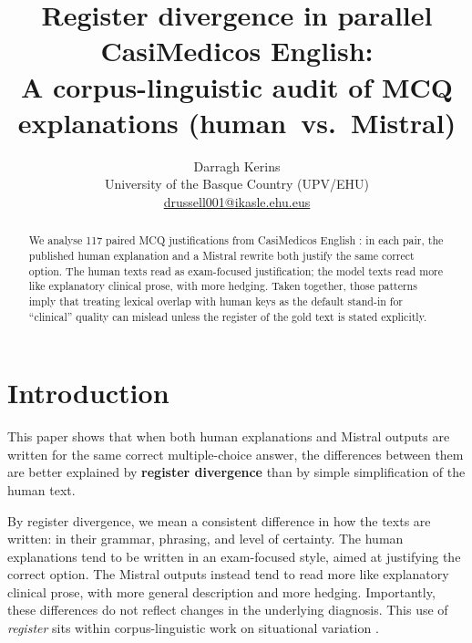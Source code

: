 \documentclass[11pt,a4paper]{article}
\title{\textbf{Register divergence in parallel CasiMedicos English:\\
A corpus-linguistic audit of MCQ explanations \mbox{(human vs.\ Mistral)}}}
\author{Darragh Kerins \\ University of the Basque Country (UPV/EHU) \\ \url{drussell001@ikasle.ehu.eus}}
\date{}
\begin{document}
\begin{@twocolumnfalse}
\maketitle
\begin{abstract}\noindent
We analyse 117 paired MCQ justifications from CasiMedicos English \cite{casimedicos}: in each pair, the published human explanation and a Mistral rewrite both justify the same correct option. The human texts read as exam-focused justification; the model texts read more like explanatory clinical prose, with more hedging. Taken together, those patterns imply that treating lexical overlap with human keys as the default stand-in for ``clinical'' quality can mislead unless the register of the gold text is stated explicitly.
\end{abstract}
\vspace{0.5em}
\begingroup
\setcounter{tocdepth}{1}%
\small\tableofcontents\par
\endgroup
\setcounter{tocdepth}{2}%
\vspace{0.5em}
\end{@twocolumnfalse}
\twocolumn
\raggedbottom
\setcounter{dbltopnumber}{2}
\renewcommand{\dbltopfraction}{0.95}
\renewcommand{\textfraction}{0.08}
\renewcommand{\topfraction}{0.92}
\renewcommand{\floatpagefraction}{0.85}

\section{Introduction}

This paper shows that when both human explanations and Mistral outputs are written for the same correct multiple-choice answer, the differences between them are better explained by \textbf{register divergence} than by simple simplification of the human text.

By register divergence, we mean a consistent difference in how the texts are written: in their grammar, phrasing, and level of certainty. The human explanations tend to be written in an exam-focused style, aimed at justifying the correct option. The Mistral outputs instead tend to read more like explanatory clinical prose, with more general description and more hedging. Importantly, these differences do not reflect changes in the underlying diagnosis. This use of \emph{register} sits within corpus-linguistic work on situational variation \cite{biber1995,ferguson1983,kilgarriff2001}.
\end{document}
